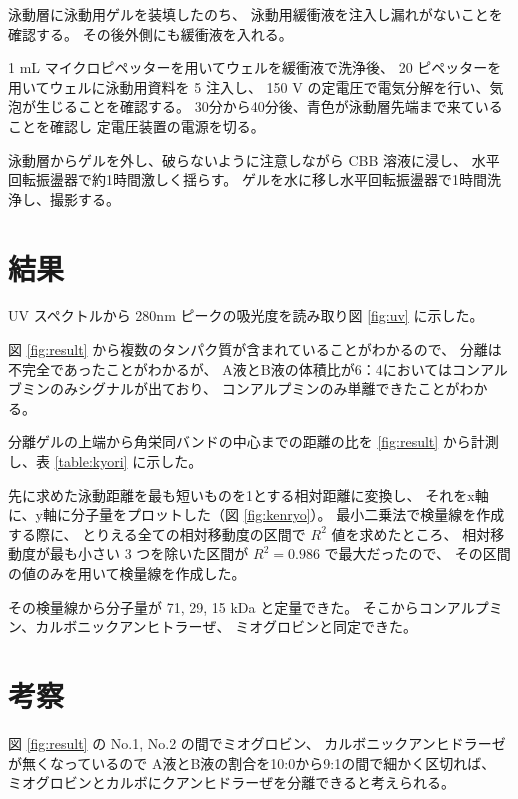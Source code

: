 \documentclass[a4paper]{ltjsarticle}
\begin{document}
泳動層に泳動用ゲルを装填したのち、
泳動用緩衝液を注入し漏れがないことを確認する。
その後外側にも緩衝液を入れる。

1 mL マイクロピペッターを用いてウェルを緩衝液で洗浄後、
20 \uL ピペッターを用いてウェルに泳動用資料を 5 \uL 注入し、
150 V の定電圧で電気分解を行い、気泡が生じることを確認する。
30分から40分後、青色が泳動層先端まで来ていることを確認し
定電圧装置の電源を切る。

泳動層からゲルを外し、破らないように注意しながら CBB 溶液に浸し、
水平回転振盪器で約1時間激しく揺らす。
ゲルを水に移し水平回転振盪器で1時間洗浄し、撮影する。

\section{結果}

UV スペクトルから 280nm ピークの吸光度を読み取り図 \ref{fig:uv} に示した。

図 \ref{fig:result} から複数のタンパク質が含まれていることがわかるので、
分離は不完全であったことがわかるが、
A液とB液の体積比が6：4においてはコンアルブミンのみシグナルが出ており、
コンアルプミンのみ単離できたことがわかる。

分離ゲルの上端から角栄同バンドの中心までの距離の比を
\ref{fig:result} から計測し、表 \ref{table:kyori} に示した。

先に求めた泳動距離を最も短いものを1とする相対距離に変換し、
それをx軸に、y軸に分子量をプロットした（図 \ref{fig:kenryo}）。
最小二乗法で検量線を作成する際に、
とりえる全ての相対移動度の区間で $ R^2 $ 値を求めたところ、
相対移動度が最も小さい 3 つを除いた区間が
$ R^2 = 0.986 $ で最大だったので、
その区間の値のみを用いて検量線を作成した。

その検量線から分子量が 71, 29, 15 kDa と定量できた。
そこからコンアルプミン、カルボニックアンヒトラーぜ、
ミオグロビンと同定できた。

\section{考察}

図 \ref{fig:result} の No.1, No.2 の間でミオグロビン、
カルボニックアンヒドラーゼが無くなっているので
A液とB液の割合を10:0から9:1の間で細かく区切れば、
ミオグロビンとカルボにクアンヒドラーぜを分離できると考えられる。
\end{document}
